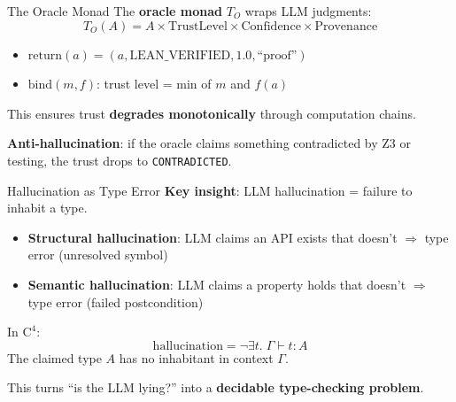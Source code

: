\documentclass[aspectratio=169,11pt]{beamer}
\newcommand{\Cfour}{\mathrm{C}^4}
\begin{document}
\begin{frame}{The Oracle Monad}
The \textbf{oracle monad} $T_O$ wraps LLM judgments:
\[
T_O(A) = A \times \mathrm{TrustLevel} \times \mathrm{Confidence} \times \mathrm{Provenance}
\]

\vspace{0.5em}
\begin{itemize}
\item $\mathrm{return}(a) = (a, \text{LEAN\_VERIFIED}, 1.0, \text{``proof''})$
\item $\mathrm{bind}(m, f)$: trust level = min of $m$ and $f(a)$
\end{itemize}

\vspace{0.5em}
This ensures trust \textbf{degrades monotonically} through computation chains.

\vspace{0.3em}
\textbf{Anti-hallucination}: if the oracle claims something contradicted by Z3 or testing, the trust drops to \texttt{CONTRADICTED}.
\end{frame}

\begin{frame}{Hallucination as Type Error}
\textbf{Key insight}: LLM hallucination = failure to inhabit a type.

\vspace{0.5em}
\begin{itemize}
\item \textbf{Structural hallucination}: LLM claims an API exists that doesn't $\Rightarrow$ type error (unresolved symbol)
\item \textbf{Semantic hallucination}: LLM claims a property holds that doesn't $\Rightarrow$ type error (failed postcondition)
\end{itemize}

\vspace{0.5em}
In $\Cfour$:
\[
\text{hallucination} = \neg\exists t.\; \Gamma \vdash t : A
\]
The claimed type $A$ has no inhabitant in context $\Gamma$.

\vspace{0.3em}
This turns ``is the LLM lying?'' into a \textbf{decidable type-checking problem}.
\end{frame}
\end{document}
